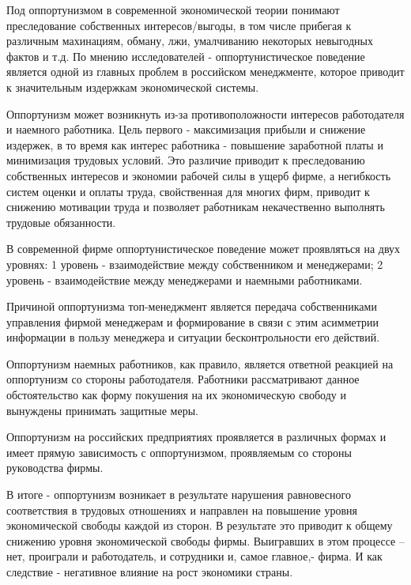 \documentclass[a4paper, 12pt]{article}
\begin{document}
Под оппортунизмом в современной экономической теории понимают преследование собственных интересов/выгоды, в том числе прибегая к различным махинациям, обману, лжи, умалчиванию некоторых невыгодных фактов и т.д.
По мнению исследователей - оппортунистическое поведение является одной из главных проблем в российском менеджменте, которое приводит к значительным издержкам экономической системы.

Оппортунизм может возникнуть из-за противоположности интересов работодателя и наемного работника.
Цель первого - максимизация прибыли и снижение издержек, в то время как интерес работника - повышение заработной платы и минимизация трудовых условий.
Это различие приводит к преследованию собственных интересов и экономии рабочей силы в ущерб фирме, а негибкость систем оценки и оплаты труда, свойственная для многих фирм, приводит к снижению мотивации труда и позволяет работникам некачественно выполнять трудовые обязанности.

В современной фирме оппортунистическое поведение может проявляться на двух уровнях: 1 уровень - взаимодействие между собственником и менеджерами; 2 уровень - взаимодействие между менеджерами и наемными работниками.

Причиной оппортунизма топ-менеджмент является передача собственниками управления фирмой менеджерам и формирование в связи с этим асимметрии информации в пользу менеджера и ситуации бесконтрольности его действий.

Оппортунизм  наемных  работников,  как  правило,  является  ответной  реакцией  на  оппортунизм со стороны работодателя.
Работники рассматривают данное обстоятельство как форму покушения на их экономическую свободу и вынуждены принимать защитные меры.

Оппортунизм  на  российских  предприятиях  проявляется  в  различных  формах  и  имеет  прямую зависимость с оппортунизмом, проявляемым со стороны руководства фирмы.

В итоге - оппортунизм возникает в результате нарушения равновесного соответствия в трудовых отношениях и направлен на повышение уровня экономической свободы каждой из сторон. В результате это приводит к общему снижению уровня экономической свободы фирмы. Выигравших в этом процессе – нет, проиграли и работодатель, и сотрудники и, самое главное,- фирма. И как следствие - негативное влияние на рост экономики страны.

\newpage
\end{document}
